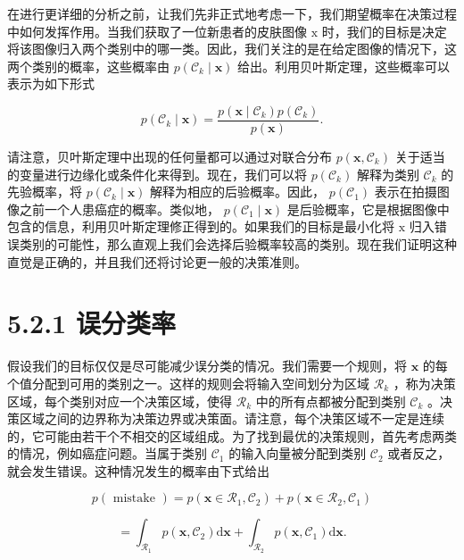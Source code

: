 \documentclass[10pt]{article}
\begin{document}
在进行更详细的分析之前，让我们先非正式地考虑一下，我们期望概率在决策过程中如何发挥作用。当我们获取了一位新患者的皮肤图像 \(\mathrm{x}\) 时，我们的目标是决定将该图像归入两个类别中的哪一类。因此，我们关注的是在给定图像的情况下，这两个类别的概率，这些概率由 \(p\left( {{\mathcal{C}}_{k} \mid  \mathbf{x}}\right)\) 给出。利用贝叶斯定理，这些概率可以表示为如下形式

\[
p\left( {{\mathcal{C}}_{k} \mid  \mathbf{x}}\right)  = \frac{p\left( {\mathbf{x} \mid  {\mathcal{C}}_{k}}\right) p\left( {\mathcal{C}}_{k}\right) }{p\left( \mathbf{x}\right) }. \tag{5.19}
\]

请注意，贝叶斯定理中出现的任何量都可以通过对联合分布 \(p\left( {\mathbf{x},{\mathcal{C}}_{k}}\right)\) 关于适当的变量进行边缘化或条件化来得到。现在，我们可以将 \(p\left( {\mathcal{C}}_{k}\right)\) 解释为类别 \({\mathcal{C}}_{k}\) 的先验概率，将 \(p\left( {{\mathcal{C}}_{k} \mid  \mathbf{x}}\right)\) 解释为相应的后验概率。因此， \(p\left( {\mathcal{C}}_{1}\right)\) 表示在拍摄图像之前一个人患癌症的概率。类似地， \(p\left( {{\mathcal{C}}_{1} \mid  \mathbf{x}}\right)\) 是后验概率，它是根据图像中包含的信息，利用贝叶斯定理修正得到的。如果我们的目标是最小化将 \(\mathrm{x}\) 归入错误类别的可能性，那么直观上我们会选择后验概率较高的类别。现在我们证明这种直觉是正确的，并且我们还将讨论更一般的决策准则。

\section*{5.2.1 误分类率}

假设我们的目标仅仅是尽可能减少误分类的情况。我们需要一个规则，将 \(\mathbf{x}\) 的每个值分配到可用的类别之一。这样的规则会将输入空间划分为区域 \({\mathcal{R}}_{k}\) ，称为决策区域，每个类别对应一个决策区域，使得 \({\mathcal{R}}_{k}\) 中的所有点都被分配到类别 \({\mathcal{C}}_{k}\) 。决策区域之间的边界称为决策边界或决策面。请注意，每个决策区域不一定是连续的，它可能由若干个不相交的区域组成。为了找到最优的决策规则，首先考虑两类的情况，例如癌症问题。当属于类别 \({\mathcal{C}}_{1}\) 的输入向量被分配到类别 \({\mathcal{C}}_{2}\) 或者反之，就会发生错误。这种情况发生的概率由下式给出

\[
p\left( \text{ mistake }\right)  = p\left( {\mathbf{x} \in  {\mathcal{R}}_{1},{\mathcal{C}}_{2}}\right)  + p\left( {\mathbf{x} \in  {\mathcal{R}}_{2},{\mathcal{C}}_{1}}\right)
\]

\[
= {\int }_{{\mathcal{R}}_{1}}p\left( {\mathbf{x},{\mathcal{C}}_{2}}\right) \mathrm{d}\mathbf{x} + {\int }_{{\mathcal{R}}_{2}}p\left( {\mathbf{x},{\mathcal{C}}_{1}}\right) \mathrm{d}\mathbf{x}. \tag{5.20}
\]
\end{document}
